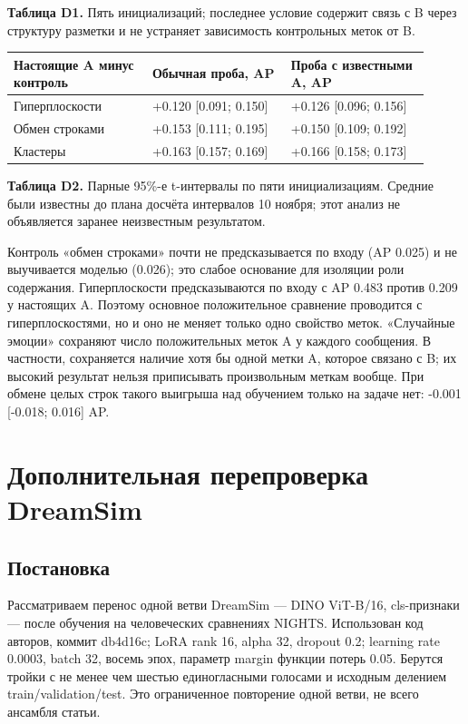 \textbf{Таблица D1.} Пять инициализаций; последнее условие содержит связь с B через структуру разметки и не устраняет зависимость контрольных меток от B.

{\small\begin{longtable}{>{\raggedright\arraybackslash}p{0.303\linewidth}>{\raggedright\arraybackslash}p{0.303\linewidth}>{\raggedright\arraybackslash}p{0.303\linewidth}}\toprule
Настоящие A минус контроль & Обычная проба, AP & Проба с известными A, AP\\\midrule\endhead
Гиперплоскости & +0.120 [0.091; 0.150] & +0.126 [0.096; 0.156]\\
Обмен строками & +0.153 [0.111; 0.195] & +0.150 [0.109; 0.192]\\
Кластеры & +0.163 [0.157; 0.169] & +0.166 [0.158; 0.173]\\
\bottomrule\end{longtable}}

\textbf{Таблица D2.} Парные 95\%-е t-интервалы по пяти инициализациям. Средние были известны до плана досчёта интервалов 10 ноября; этот анализ не объявляется заранее неизвестным результатом.

Контроль «обмен строками» почти не предсказывается по входу (AP 0.025) и не выучивается моделью (0.026); это слабое основание для изоляции роли содержания. Гиперплоскости предсказываются по входу с AP 0.483 против 0.209 у настоящих A. Поэтому основное положительное сравнение проводится с гиперплоскостями, но и оно не меняет только одно свойство меток. «Случайные эмоции» сохраняют число положительных меток A у каждого сообщения. В частности, сохраняется наличие хотя бы одной метки A, которое связано с B; их высокий результат нельзя приписывать произвольным меткам вообще. При обмене целых строк такого выигрыша над обучением только на задаче нет: -0.001 [-0.018; 0.016] AP.

\section{Дополнительная перепроверка DreamSim}\label{app:dreamsim}

\subsection{Постановка}

Рассматриваем перенос одной ветви DreamSim — DINO ViT-B/16, cls-признаки — после обучения на человеческих сравнениях NIGHTS. Использован код авторов, коммит db4d16c; LoRA rank 16, alpha 32, dropout 0.2; learning rate 0.0003, batch 32, восемь эпох, параметр margin функции потерь 0.05. Берутся тройки с не менее чем шестью единогласными голосами и исходным делением train/validation/test. Это ограниченное повторение одной ветви, не всего ансамбля статьи.

